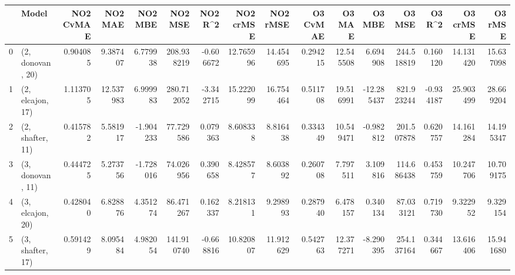 \begin{tabular}{llrrrrrrrrrrrrrr}
\toprule
{} &             Model &  NO2 CvMAE &    NO2 MAE &   NO2 MBE &     NO2 MSE &   NO2 R\textasciicircum2 &  NO2 crMSE &   NO2 rMSE &  O3 CvMAE &     O3 MAE &     O3 MBE &      O3 MSE &    O3 R\textasciicircum2 &   O3 crMSE &    O3 rMSE \\
\midrule
0 &  (2, donovan, 20) &   0.904085 &   9.387407 &  6.779938 &  208.938219 & -0.606672 &  12.765996 &  14.454695 &  0.294215 &  12.545508 &   6.694908 &  244.518819 &  0.160120 &  14.131420 &  15.637098 \\
1 &  (2, elcajon, 17) &   1.113705 &  12.537983 &  6.999983 &  280.712052 & -3.342715 &  15.222099 &  16.754464 &  0.511708 &  19.516991 & -12.285437 &  821.923244 & -0.934187 &  25.903499 &  28.669204 \\
2 &  (2, shafter, 11) &   0.415782 &   5.581917 & -1.904233 &   77.729586 &  0.079363 &   8.608338 &   8.816438 &  0.334349 &  10.549471 &  -0.982812 &  201.507878 &  0.620757 &  14.161284 &  14.195347 \\
3 &  (3, donovan, 11) &   0.444725 &   5.273756 & -1.728016 &   74.026956 &  0.390658 &   8.428577 &   8.603892 &  0.260708 &   7.797511 &   3.109816 &  114.686438 &  0.453759 &  10.247706 &  10.709175 \\
4 &  (3, elcajon, 20) &   0.428040 &   6.828876 &  4.351274 &   86.471267 &  0.162337 &   8.218131 &   9.298993 &  0.287940 &   6.478157 &   0.340134 &   87.033121 &  0.719730 &   9.322952 &   9.329154 \\
5 &  (3, shafter, 17) &   0.591429 &   8.095484 &  4.982054 &  141.910740 & -0.668816 &  10.820807 &  11.912629 &  0.542763 &  12.377271 &  -8.290395 &  254.137164 &  0.344667 &  13.616406 &  15.941680 \\
\bottomrule
\end{tabular}
